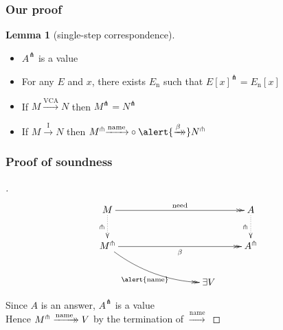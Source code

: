 \documentclass[dvipdfmx,cjk,xcolor=dvipsnames,envcountsect,notheorems,12pt]{beamer}
\theoremstyle{definition}
\newtheorem{lemma}{Lemma}
\newcommand{\xtwoheadrightarrow}[2][]{%
  \xrightarrow[#1]{#2}\mathrel{\mkern-14mu}\rightarrow
}
\newcommand{\EXPANDLET}[1]{#1^\pitchfork}
\newcommand{\CALLBYNEEDI}{\xrightarrow{\mathrm{I}}}
\newcommand{\CALLBYNEEDVCA}{\xrightarrow{\mathrm{VCA}}}
\newcommand{\CALLBYNAME}{\xrightarrow{\mathrm{name}}}
\newcommand{\RTCLOSFULLBETA}{\xtwoheadrightarrow{\beta}}
\newcommand{\RTCLOSCALLBYNAME}{\xtwoheadrightarrow{\mathrm{name}}}
\begin{document}
\begin{frame}
	\frametitle{Our proof}
	\begin{lemma}[single-step correspondence]
	\begin{itemize}
		\item $\EXPANDLET{A}$ is a value
		\item For any $E$ and $x$, there exists $E_\mathrm{n}$ such that $\EXPANDLET{E[x]} = E_\mathrm{n}[x]$
		\item If $M \CALLBYNEEDVCA N$ then \alert{$\EXPANDLET{M} = \EXPANDLET{N}$}
		\item If $M \CALLBYNEEDI N$ then $\EXPANDLET{M}{\CALLBYNAME}\circ{\alert{\RTCLOSFULLBETA}} \EXPANDLET{N}$
	\end{itemize}
	\end{lemma}
\end{frame}

\begin{frame}
	\frametitle{Proof of soundness}
	\begin{proof}[]
		\Large
		\[\xymatrix{
			M \ar@{->>}[rrrr]^-{\mathrm{need}} \ar@{.>}[d]_-\pitchfork & & & & A \ar@{.>}[d]_-\pitchfork \\
			\EXPANDLET{M} \ar@{->>}[rrrr]_-{\beta} \ar@{->>}@/_10pt/@[red][rrrd]_-{\alert{\mathrm{name}}} & & & & \EXPANDLET{A} \\
			& & & \exists V &
		} \]

		Since $A$ is an answer, $\EXPANDLET{A}$ is a value \\
		Hence $\EXPANDLET{M}\RTCLOSCALLBYNAME V$ by the termination of $\CALLBYNAME$
	\end{proof}
\end{frame}
\end{document}

